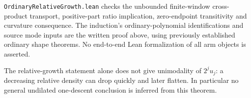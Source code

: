 \texttt{OrdinaryRelativeGrowth.lean} checks the unbounded
finite-window cross-product transport, positive-part ratio
implication, zero-endpoint transitivity and curvature consequence.
The induction's ordinary-polynomial identifications and source
mode inputs are the written proof above, using previously
established ordinary shape theorems. No end-to-end Lean
formalization of all arm objects is asserted.

The relative-growth statement alone does not give unimodality
of $2^j u_j$: a decreasing relative density can drop quickly
and later flatten. In particular no general undilated
one-descent conclusion is inferred from this theorem.
